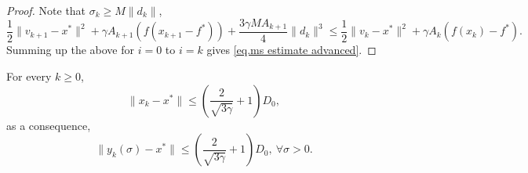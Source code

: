 \documentclass{article}
\begin{document}
\begin{proof}
    Note that $\sigma_k \geq M\|d_k\|$,
    \begin{equation*}
        \frac{1}{2}\|v_{k+1}-x^* \|^2 +\gamma A_{k+1}\left (f(x_{k+1}-f^*)\right)+ \frac{3\gamma M A_{k+1}}{4}\|d_k\|^3 \leq \frac{1}{2}\|v_k-x^*\|^2 +\gamma A_k \left (f(x_k)-f^*\right).
    \end{equation*}
    Summing up the above for $i=0$ to $i=k$ gives \eqref{eq.ms estimate advanced}.
\end{proof}
\begin{lemma}
    \label{lem.bounded iterate}
    For every $k\geq 0$, 
    \begin{equation}
        \label{eq.bounded iterate}
        \|x_k- x^*\| \leq \left(\frac{2}{\sqrt{3\gamma}}+1\right)D_0,
    \end{equation}
    as a consequence,
    \begin{equation}
        \label{eq.bounded iterate y}
        \|y_k(\sigma)-x^*\| \leq \left(\frac{2}{\sqrt{3\gamma}}+1\right)D_0, \ \forall \sigma>0.
    \end{equation}
\end{lemma}
\end{document}
